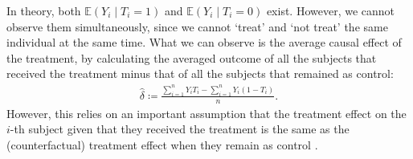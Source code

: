 \documentclass{amsart}
\begin{document}
In theory, both $\mathbb{E}(Y_i\mid T_i=1)$ and $\mathbb{E}(Y_i\mid T_i=0)$ exist.
However, we cannot observe them simultaneously, since we cannot `treat' and `not treat' the same individual at the same time.
What we can observe is the average causal effect of the treatment,
by calculating the averaged
outcome of all the subjects that received the treatment
minus that of all the subjects that remained as control:
\begin{align}
  \hat{\delta} \coloneqq 
  \frac{\sum_{i=1}^n Y_iT_i-\sum_{i=1}^n Y_i(1-T_i)}{n}.
\end{align}
However, this relies on an important assumption that the treatment effect
on the $i$-th subject given that they received the treatment is the same as the (counterfactual) treatment effect when they remain as control \cite{winship99}.
\end{document}
